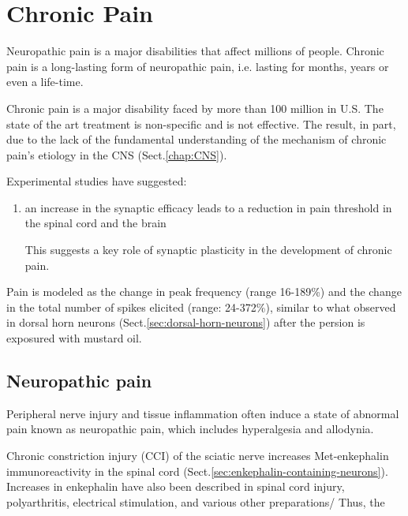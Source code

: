 \chapter{Chronic Pain}

Neuropathic pain is a major disabilities that affect millions of people.
Chronic pain is a long-lasting form of neuropathic pain, i.e. lasting for
months, years or even a life-time.

Chronic pain is a major disability faced by more than 100 million in U.S. 
The state of the art treatment is non-specific and is not effective.
The result, in part, due to the lack of the fundamental understanding of the
mechanism of chronic pain's etiology in the CNS (Sect.\ref{chap:CNS}).

Experimental studies have suggested:
\begin{enumerate}
  \item an increase in the synaptic efficacy leads to a reduction in pain
  threshold in the spinal cord and the brain
  
  This suggests a key role of synaptic plasticity in the development of chronic
  pain.
  
\end{enumerate}


Pain is modeled as the change in peak frequency (range 16-189\%) and the change
in the total number of spikes elicited (range: 24-372\%), similar to what
observed in dorsal horn neurons (Sect.\ref{sec:dorsal-horn-neurons}) after the
persion is exposured with mustard oil.

\section{Neuropathic pain}
\label{sec:neuropathic-pain}

Peripheral nerve injury and tissue inflammation often induce a state of abnormal
pain known as neuropathic pain, which includes hyperalgesia and allodynia.

Chronic constriction injury (CCI) of the sciatic nerve increases Met-enkephalin
immunoreactivity in the spinal cord
(Sect.\ref{sec:enkephalin-containing-neurons}). Increases in enkephalin have
also been described in spinal cord injury, polyarthritis, electrical
stimulation, and various other preparations/
Thus, the 
